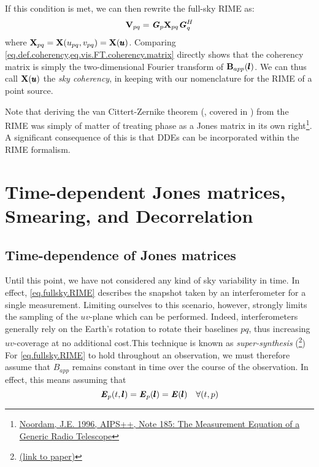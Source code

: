 \pg
If this condition is met, we can then rewrite the full-sky RIME as:
\begin{equation}\label{eq.fullsky.RIME}
\textbf{V}_{pq} = \textbf{\emph{G}}_p \textbf{X}_{pq} \textbf{\emph{G}}_q^H
\end{equation}
where $\textbf{X}_{pq} = \textbf{X}(u_{pq},v_{pq}) = \textbf{X}(\pmb{u})$. Comparing \cref{eq.def.coherency,eq.vis.FT.coherency.matrix} directly shows that the coherency matrix is simply the two-dimensional Fourier transform of $\textbf{B}_{app}(\pmb{l})$. We can thus call $\textbf{X}(\pmb{u})$ the \emph{sky coherency}, in keeping with our nomenclature for the RIME of a point source.

\pg
Note that deriving the van Cittert-Zernike theorem (, covered in ) from the RIME was simply of matter of treating phase as a Jones matrix in its own right\footnote{\href{https://raw.githubusercontent.com/wiki/ska-sa/meqtrees/aips++_note185.pdf}{Noordam, J.E. 1996, AIPS++, Note 185: The Measurement Equation of a Generic Radio Telescope}}. A significant consequence of this is that DDEs can be incorporated within the RIME formalism.

\section{Time-dependent Jones matrices, Smearing, and Decorrelation}
\label{section.RIME.TimeDep}

\subsection{Time-dependence of Jones matrices}
\label{section.RIME.TimeDep.Jones}

\pg
Until this point, we have not considered any kind of sky variability in time. In effect, \cref{eq.fullsky.RIME} describes the snapshot taken by an interferometer for a single measurement. Limiting ourselves to this scenario, however, strongly limits the sampling of the $uv$-plane which can be performed. Indeed, interferometers generally rely on the Earth's rotation to rotate their baselines $pq$, thus increasing $uv$-coverage at no additional cost.This technique is known as \emph{super-synthesis} (\cite{supersynthesis}\footnote{\href{http://www.jpier.org/PIERB/pierb22/05.10032105.pdf}{(link to paper)}}) For \cref{eq.fullsky.RIME} to hold throughout an observation, we must therefore assume that $B_{app}$ remains constant in time over the course of the observation. In effect, this means assuming that
\begin{equation}\label{eq.selfcal.requirement}
\textbf{\emph{E}}_p(t,\pmb{l}) = \textbf{\emph{E}}_p(\pmb{l}) = \textbf{\emph{E}}(\pmb{l}) \quad \forall (t,p)
\end{equation}

